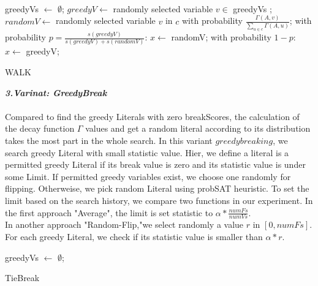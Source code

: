 \documentclass[12pt,a4paper,twoside]{scrartcl}
\numberwithin{equation}{section}
\begin{document}
 \\
\begin{algorithm}[H]
 greedyVs $\leftarrow$ $\emptyset$;\;
  $greedyV \leftarrow$   randomly selected variable $v \in$ greedyVs  ; \;
  $randomV \leftarrow$ randomly selected  variable $v$ in $c$ with probability $\frac{\Gamma(A,v)}{\sum_{u \in c}\Gamma(A,u)}$;  \;
  with probability $p = \frac{s(greedyV)}{s(greedyV)+s(randomV)}$: $x\leftarrow$ randomV;\;
    with probability $1-p$: $x\leftarrow$ greedyV;\;
\caption{WALK}
\end{algorithm} 
 \emph{\textbf{3.Varinat: GreedyBreak}}\\
\\  Compared to find the greedy Literals with zero breakScores, the calculation of the decay function $\Gamma$ values and get a random literal according to its distribution takes the most part in the whole search. In this variant $greedybreaking$, we search greedy Literal with small statistic value.  Hier, we define a literal is a permitted greedy Literal if its break value is zero and its statistic value is under some Limit. If permitted greedy variables exist, we choose one randomly for flipping. Otherweise, we pick random Literal using probSAT heuristic. To set the limit based on the search history, we compare two functions in our experiment. In the first approach "Average", the limit is set statistic to $\alpha*\frac{numFs}{numVs}$.\\
 In another approach "Random-Flip,"we select randomly a value $r $ in $[0, numFs]$. For each greedy Literal, we check if its statistic value is smaller than $\alpha * r$. \\
\begin{algorithm}[H]
  greedyVs $\leftarrow$ $\emptyset$;\;
  \;
\caption{TieBreak}
\end{algorithm} 
\end{document}
